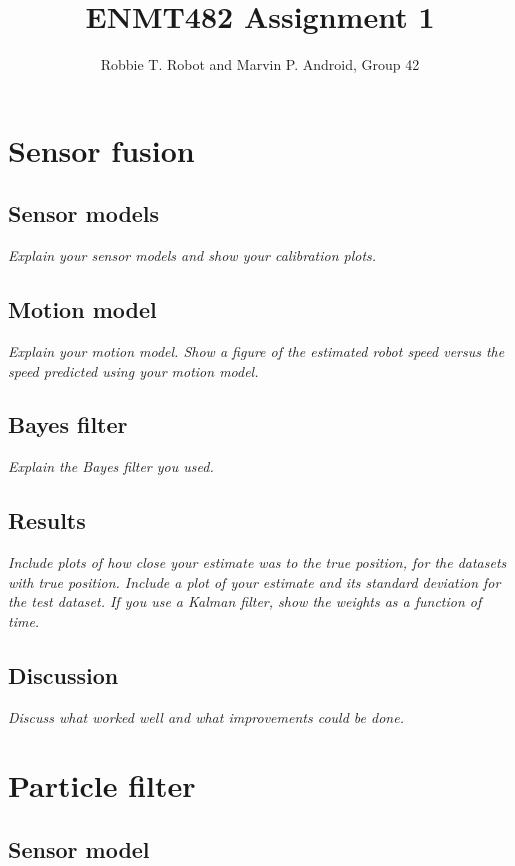 \documentclass[a4paper,12pt]{article}
\title{ENMT482 Assignment 1}
\author{Robbie T. Robot and Marvin P. Android, Group 42}
\date{}
\newcommand{\comment}[1]{\emph{\color{blue}#1}}
\begin{document}
\maketitle

\section{Sensor fusion}


\subsection{Sensor models}

\comment{Explain your sensor models and show your calibration plots.}


\subsection{Motion model}

\comment{Explain your motion model.  Show a figure of the estimated
  robot speed versus the speed predicted using your motion model.}


\subsection{Bayes filter}

\comment{Explain the Bayes filter you used.}


\subsection{Results}

\comment{Include plots of how close your estimate was to the true
  position, for the datasets with true position.  Include a plot of
  your estimate and its standard deviation for the test dataset.  If
  you use a Kalman filter, show the weights as a function of time.}


\subsection{Discussion}

\comment{Discuss what worked well and what improvements could be
  done.}


\section{Particle filter}

\subsection{Sensor model}
\end{document}
